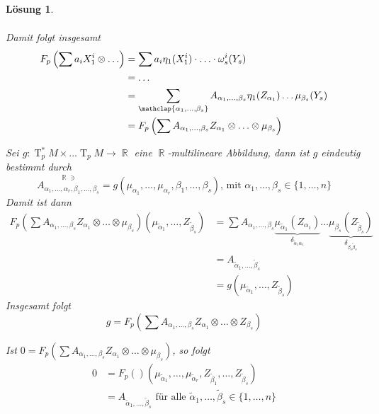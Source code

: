\documentclass[paper=A4, twoside, chapterprefix=true, bibliography=totoc, headsepline]{scrbook}
\DeclareMathOperator{\R}{\mathbb{R}}
\DeclareMathOperator{\T}{T}         %
\newcommand{\X}{\times}
\theoremstyle{plain}
\theoremstyle{nonumberplain}
\theoremstyle{empty}
\theoremstyle{break}
\newtheorem{Loes}{L\"osung}
\begin{document}
\begin{Loes}
\begin{description}[leftmargin=*]
\begin{itemize}[leftmargin=*]
\begin{align*}
			\end{align*}
			Damit folgt insgesamt
			\begin{align*}
				F_p\left(\sum a_i X_1^{i} \otimes \ldots \right) &= \sum a_i \eta_1 (X_1^{i}) \cdot \ldots \cdot \omega_s^{i} (Y_s) \\
					& = \ldots \\
					& = \sum_{\mathclap{\alpha_1,\ldots ,\beta_s}} A_{\alpha_1,\ldots ,\beta_s} \eta_1(Z_{\alpha_1}) \ldots \mu_{\beta_s}(Y_s)\\
					& = F_p \left(\sum A_{\alpha_1,\ldots ,\beta_s} Z_{\alpha_1} \otimes \ldots \otimes \mu_{\beta_s}\right)
			\end{align*}
	\end{itemize}
\item[$\bm{F_p}$ ist $\R$-linear]
\item[$\bm{F_p}$ ist surjektiv:]
	Sei $g: \T_p^*M \X \ldots \T_pM \to \R$ eine $\R$-multilineare Abbildung, dann ist $g$ eindeutig bestimmt durch
		\[ \overset{\R \ni}{A_{\alpha_1, \ldots , \alpha_r, \beta_1, \ldots , \beta_s}} = g(\mu_{\alpha_1}, \ldots , \mu_{\alpha_r}, \beta_1, \ldots , \beta_s) \text{, mit } \alpha_1, \ldots , \beta_s \in \{1,\ldots ,n\} \]
	Damit ist dann
	\begin{align*}
		F_p\left(\sum A_{\alpha_1,\ldots ,\beta_s} Z_{\alpha_1} \otimes \ldots \otimes \mu_{\beta_s}\right) (\mu_{\tilde\alpha_1},\ldots ,Z_{\tilde\beta_s}) &= \sum A_{\alpha_1,\ldots ,\beta_s} \underbrace{\mu_{\tilde \alpha_1}(Z_{\alpha_1})}_{\delta_{\tilde \alpha_1 \alpha_1}} \ldots \underbrace{\mu_{\beta_s} (Z_{\tilde \beta_s})}_{\delta_{\beta_s\tilde\beta_s}}\\
		&= A_{\tilde\alpha_1,\ldots ,\tilde\beta_s}\\
		&= g(\mu_{\tilde\alpha_1},\ldots ,Z_{\tilde\beta_s})
	\end{align*}
	Insgesamt folgt
		\[ g = F_p\left(\sum A_{\alpha_1,\ldots ,\beta_s} Z_{\alpha_1} \otimes \ldots  \otimes Z_{\beta_s}\right) \]
\item[$\bm{F_p}$ ist injektiv:]
	Ist $0 = F_p(\sum A_{\alpha_1,\ldots ,\beta_s} Z_{\alpha_1} \otimes \ldots \otimes \mu_{\beta_s})$, so folgt
	\begin{align*}
		0 &= F_p() (\mu_{\tilde\alpha_1},\ldots ,\mu_{\tilde\alpha_r}, Z_{\tilde\beta_1}, \ldots , Z_{\tilde\beta_s})\\
		&= A_{\tilde\alpha_1,\ldots ,\tilde\beta_s} \text{ f\"ur alle } \tilde\alpha_1, \ldots , \tilde\beta_s \in \{1,\ldots ,n\}
	\end{align*}

\end{description}
\end{Loes}
\end{document}

